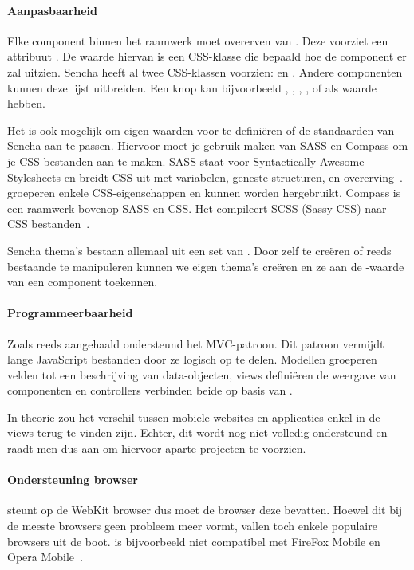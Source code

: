 \paragraph{Aanpasbaarheid}
\label{sec:sencha-aanpasbaarheid}
Elke component binnen het raamwerk moet overerven van .  
Deze voorziet een attribuut .  
De waarde hiervan is een CSS-klasse die bepaald hoe de component er zal uitzien.  
Sencha heeft al twee CSS-klassen voorzien:   en .  
Andere componenten kunnen deze lijst uitbreiden.  
Een knop kan bijvoorbeeld ,  ,  ,  ,   of  als  waarde hebben.

Het is ook mogelijk om eigen waarden voor  te definiëren of de standaarden van Sencha aan te passen.  
Hiervoor moet je gebruik maken van SASS en Compass om je CSS bestanden aan te maken.  
SASS staat voor Syntactically Awesome Stylesheets en breidt CSS uit met variabelen,  geneste structuren,  en overerving~\cite{Eppstein2013}.  
 groeperen enkele CSS-eigenschappen en kunnen worden hergebruikt.  
Compass is een raamwerk bovenop SASS en CSS.  
Het compileert SCSS (Sassy CSS) naar CSS bestanden~\cite{Eppstein2013a}.        

Sencha thema's bestaan allemaal uit een set van .  
Door zelf  te creëren of reeds bestaande te manipuleren kunnen we eigen thema's creëren en ze aan de -waarde van een component toekennen.

\paragraph{Programmeerbaarheid}
\label{sec:sencha-programeerbaarheid}
Zoals reeds aangehaald ondersteund \st{} het MVC-patroon.  
Dit patroon vermijdt lange JavaScript bestanden door ze logisch op te delen.  
Modellen groeperen velden tot een beschrijving van data-objecten, views definiëren de weergave van componenten en controllers verbinden beide op basis van .

In theorie zou het verschil tussen mobiele websites en applicaties enkel in de views terug te vinden zijn.  
Echter,  dit wordt nog niet volledig ondersteund en raadt men dus aan om hiervoor aparte projecten te voorzien.

\paragraph{Ondersteuning browser}
\st{} steunt op de WebKit browser  dus moet de browser deze bevatten.  
Hoewel dit bij de meeste browsers geen probleem meer vormt, vallen toch enkele populaire browsers uit de boot.  
\st{} is bijvoorbeeld niet compatibel met FireFox Mobile en Opera Mobile~\cite{JohnEClark2012}.

